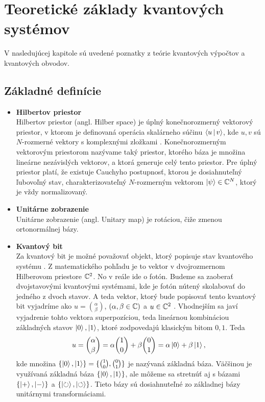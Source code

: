 
\chapter{Teoretické základy kvantových systémov}

V nasledujúcej kapitole sú uvedené poznatky z teórie kvantových výpočtov a kvantových obvodov.

\section{Základné definície}

\begin{itemize}
\item[] \textbf{Hilbertov priestor} \\
\label{hil_space}
Hilbertov priestor (angl. Hilber space) je úplný konečnorozmerný vektorový priestor, v ktorom je definovaná operácia skalárneho súčinu \(\Braket{u|v}\), kde \(u,v\) sú \(N\)-rozmerné vektory s komplexnými zložkami \cite{Nie10}.
Konečnorozmerným vektorovým priestorom nazývame taký priestor, ktorého báza je množina lineárne nezávislých  vektorov, a ktorá generuje celý tento priestor.
Pre úplný priestor platí, že existuje Cauchyho postupnosť, ktorou je dosiahnuteľný ľubovoľný stav, charakterizovateľný \(N\)-rozmerným vektorom \(\Ket{\psi} \in \mathbb{C}^{N}\), ktorý je vždy normalizovaný.

\item[] \textbf{Unitárne zobrazenie} \\
Unitárne zobrazenie (angl. Unitary map) je rotáciou, čiže zmenou ortonormálnej bázy.

\item[] \textbf{Kvantový bit} \\
Za kvantový bit je možné považovať objekt, ktorý popisuje stav kvantového systému \cite{Schu95}.
Z matematického pohľadu je to vektor v dvojrozmernom Hilberovom priestore \(\mathbb{C}^{2}\).
No v reále ide o fotón.
Budeme sa zaoberať dvojstavovými kvantovými systémami, kde je fotón nútený skolabovať do jedného z dvoch stavov.
A teda vektor, ktorý bude popisovať tento kvantový bit vyjadríme ako \(u = \binom{\alpha}{\beta}\), \( ( \alpha, \beta \in \mathbb{C} ) \) a \(u \in \mathbb{C}^{2}\) \cite{Kay07}.
Vhodnejším sa javí vyjadrenie tohto vektora superpozíciou, teda lineárnou kombináciou základných stavov \(\Ket{0}, \Ket{1}\), ktoré zodpovedajú klasickým bitom \(0,1\).
Teda \[u = \binom{\alpha}{\beta} = \alpha \binom{1}{0} + \beta \binom{0}{1} = \alpha\Ket{0} + \beta\Ket{1},\]
kde množina \(\{\Ket{0}, \Ket{1}\} = \{\binom{1}{0}, \binom{0}{1}\}\) je nazývaná základná báza.
Väčšinou je využívaná základná báza \(\{\Ket{0}, \Ket{1}\}\), ale môžeme sa 
stretnúť aj s bázami \(\{\Ket{+}, \Ket{-}\}\) a \(\{\Ket{\circlearrowright}, \Ket{\circlearrowleft}\}\). Tieto bázy sú dosiahnuteľné zo základnej bázy unitárnymi transformáciami.


\end{itemize}
